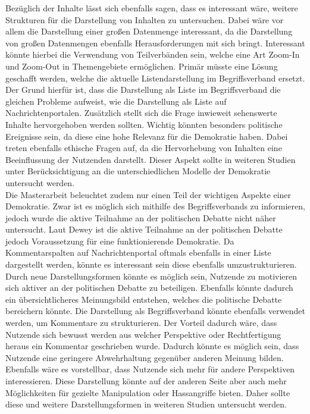 Bezüglich der Inhalte lässt sich ebenfalls sagen, dass es interessant wäre, weitere Strukturen für die Darstellung von Inhalten zu untersuchen.
Dabei wäre vor allem die Darstellung einer großen Datenmenge interessant, da die Darstellung von großen Datenmengen ebenfalls Herausforderungen mit sich bringt.
Interessant könnte hierbei die Verwendung von Teilverbänden sein, welche eine Art Zoom-In und Zoom-Out in Themengebiete ermöglichen.
Primär müsste eine Lösung geschafft werden, welche die aktuelle Listendarstellung im Begriffsverband ersetzt.
Der Grund hierfür ist, dass die Darstellung als Liste im Begriffsverband die gleichen Probleme aufweist, wie die Darstellung als Liste auf Nachrichtenportalen.
Zusätzlich stellt sich die Frage inwieweit sehenswerte Inhalte hervorgehoben werden sollten.
Wichtig könnten besonders politische Ereignisse sein, da diese eine hohe Relevanz für die Demokratie haben.
Dabei treten ebenfalls ethische Fragen auf, da die Hervorhebung von Inhalten eine Beeinflussung der Nutzenden darstellt.
Dieser Aspekt sollte in weiteren Studien unter Berücksichtigung an die unterschiedlichen Modelle der Demokratie untersucht werden.\\

Die Masterarbeit beleuchtet zudem nur einen Teil der wichtigen Aspekte einer Demokratie.
Zwar ist es möglich sich mithilfe des Begriffsverbands zu informieren, jedoch wurde die aktive Teilnahme an der politischen Debatte nicht näher untersucht.
Laut Dewey ist die aktive Teilnahme an der politischen Debatte jedoch Voraussetzung für eine funktionierende Demokratie.
Da Kommentarspalten auf Nachrichtenportal oftmals ebenfalls in einer Liste dargestellt werden, könnte es interessant sein diese ebenfalls umzustrukturieren.
Durch neue Darstellungsformen könnte es möglich sein, Nutzende zu motivieren sich aktiver an der politischen Debatte zu beteiligen.
Ebenfalls könnte dadurch ein übersichtlicheres Meinungsbild entstehen, welches die politische Debatte bereichern könnte.
Die Darstellung als Begriffsverband könnte ebenfalls verwendet werden, um Kommentare zu strukturieren.
Der Vorteil dadurch wäre, dass Nutzende sich bewusst werden aus welcher Perspektive oder Rechtfertigung heraus ein Kommentar geschrieben wurde.
Dadurch könnte es möglich sein, dass Nutzende eine geringere Abwehrhaltung gegenüber anderen Meinung bilden.
Ebenfalls wäre es vorstellbar, dass Nutzende sich mehr für andere Perspektiven interessieren.
Diese Darstellung könnte auf der anderen Seite aber auch mehr Möglichkeiten für gezielte Manipulation oder Hassangriffe bieten.
Daher sollte diese und weitere Darstellungsformen in weiteren Studien untersucht werden.\\

